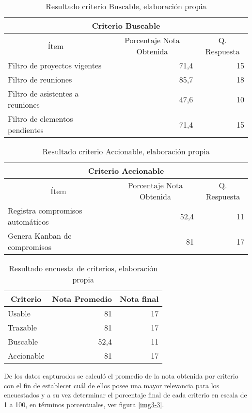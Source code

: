 \begin{table}[!h]
\centering
\caption{Resultado criterio Buscable, elaboración propia}
\label{tab:buscable}
\begin{tabular}{|l|r|r|}
\hline
\multicolumn{3}{|c|}{Criterio Buscable} \\ \hline
\multicolumn{1}{|c|}{Ítem} & \multicolumn{1}{c|}{Porcentaje Nota Obtenida} & \multicolumn{1}{c|}{Q. Respuesta} \\ \hline
Filtro de proyectos vigentes & 71,4 & 15 \\ \hline
Filtro de reuniones & 85,7 & 18 \\ \hline
Filtro de asistentes a reuniones & 47,6 & 10 \\ \hline
Filtro de elementos pendientes & 71,4 & 15 \\ \hline
\end{tabular}
\end{table}

\begin{table}[!h]
\centering
\caption{Resultado criterio Accionable, elaboración propia}
\label{tab:accionable}
\begin{tabular}{|l|r|r|}
\hline
\multicolumn{3}{|c|}{Criterio Accionable} \\ \hline
\multicolumn{1}{|c|}{Ítem} & \multicolumn{1}{c|}{Porcentaje Nota Obtenida} & \multicolumn{1}{c|}{Q. Respuesta} \\ \hline
Registra compromisos automáticos & 52,4 & 11 \\ \hline
Genera Kanban de compromisos & 81 & 17 \\ \hline
\end{tabular}
\end{table}

\begin{table}[!h]
\centering
\caption{Resultado encuesta de criterios, elaboración propia}
\label{tab:resultado}
\begin{tabular}{|l|r|r|}
\hline
\multicolumn{1}{|c|}{Criterio} & \multicolumn{1}{c|}{Nota Promedio} & \multicolumn{1}{c|}{Nota final} \\ \hline
Usable & 81 & 17 \\ \hline
Trazable & 81 & 17 \\ \hline
Buscable & 52,4 & 11 \\ \hline
Accionable & 81 & 17 \\ \hline
\end{tabular}
\end{table}

De los datos capturados se calculó el promedio de la nota obtenida por criterio con el fin de establecer cuál de ellos posee una mayor relevancia para los encuestados y a su vez determinar el porcentaje final de cada criterio en escala de 1 a 100, en términos porcentuales, ver figura \ref{img3-3}.


